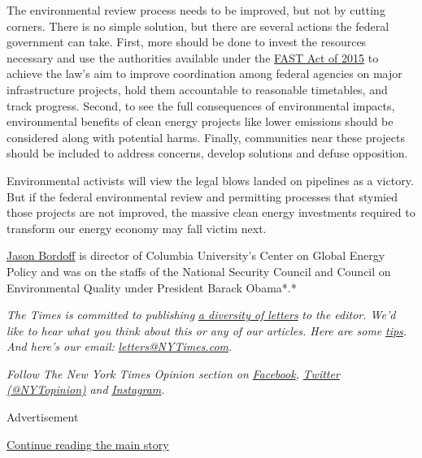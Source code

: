 The environmental review process needs to be improved, but not by
cutting corners. There is no simple solution, but there are several
actions the federal government can take. First, more should be done to
invest the resources necessary and use the authorities available under
the
\href{https://law.stanford.edu/2015/12/10/congress-just-enacted-new-permitting-requirements-for-energy-projects-did-you-miss-it/}{FAST
Act of 2015} to achieve the law's aim to improve coordination among
federal agencies on major infrastructure projects, hold them accountable
to reasonable timetables, and track progress. Second, to see the full
consequences of environmental impacts, environmental benefits of clean
energy projects like lower emissions should be considered along with
potential harms. Finally, communities near these projects should be
included to address concerns, develop solutions and defuse opposition.

Environmental activists will view the legal blows landed on pipelines as
a victory. But if the federal environmental review and permitting
processes that stymied those projects are not improved, the massive
clean energy investments required to transform our energy economy may
fall victim next.

\href{https://sipa.columbia.edu/faculty-research/faculty-directory/jason-bordoff}{Jason
Bordoff} is director of Columbia University's Center on Global Energy
Policy and was on the staffs of the National Security Council and
Council on Environmental Quality under President Barack Obama*.*

\emph{The Times is committed to publishing}
\href{https://www.nytimes3xbfgragh.onion/2019/01/31/opinion/letters/letters-to-editor-new-york-times-women.html}{\emph{a
diversity of letters}} \emph{to the editor. We'd like to hear what you
think about this or any of our articles. Here are some}
\href{https://help.nytimes3xbfgragh.onion/hc/en-us/articles/115014925288-How-to-submit-a-letter-to-the-editor}{\emph{tips}}\emph{.
And here's our email:}
\href{mailto:letters@NYTimes.com}{\emph{letters@NYTimes.com}}\emph{.}

\emph{Follow The New York Times Opinion section on}
\href{https://www.facebookcorewwwi.onion/nytopinion}{\emph{Facebook}}\emph{,}
\href{http://twitter.com/NYTOpinion}{\emph{Twitter (@NYTopinion)}}
\emph{and}
\href{https://www.instagram.com/nytopinion/}{\emph{Instagram}}\emph{.}

Advertisement

\protect\hyperlink{after-bottom}{Continue reading the main story}

